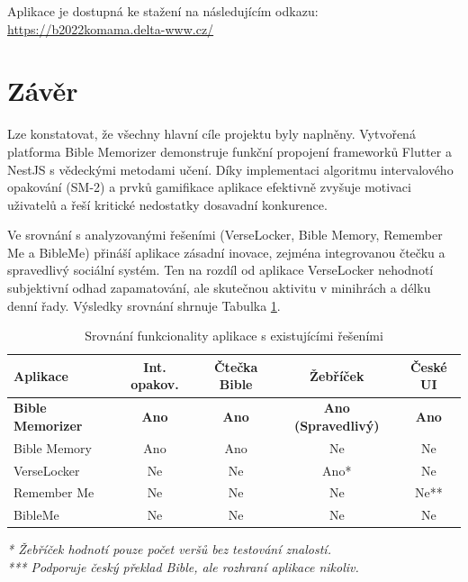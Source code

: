 \documentclass[12pt, a4paper, oneside]{article}
\begin{document}
	Aplikace je dostupná ke stažení na následujícím odkazu: \\
	\url{https://b2022komama.delta-www.cz/}
	
	\newpage
	\section*{Závěr}
	
	
	Lze konstatovat, že všechny hlavní cíle projektu byly naplněny. Vytvořená platforma Bible Memorizer demonstruje funkční propojení frameworků Flutter a NestJS s vědeckými metodami učení. Díky implementaci algoritmu intervalového opakování (SM-2) a prvků gamifikace aplikace efektivně zvyšuje motivaci uživatelů a řeší kritické nedostatky dosavadní konkurence.
	
	Ve srovnání s analyzovanými řešeními (VerseLocker, Bible Memory, Remember Me a BibleMe) přináší aplikace zásadní inovace, zejména integrovanou čtečku a spravedlivý sociální systém. Ten na rozdíl od aplikace VerseLocker nehodnotí subjektivní odhad zapamatování, ale skutečnou aktivitu v minihrách a délku denní řady. Výsledky srovnání shrnuje Tabulka \ref{tab:srovnani_aplikaci}.
	
	\begin{table}[H]
		\centering
		\renewcommand{\arraystretch}{1.2} %
		\small %
		\begin{tabular}{|l|c|c|c|c|}
			\hline
			\textbf{Aplikace} & \textbf{Int. opakov.} & \textbf{Čtečka Bible} & \textbf{Žebříček} & \textbf{České UI} \\
			\hline
			\hline
			\textbf{Bible Memorizer} & \textbf{Ano} & \textbf{Ano} & \textbf{Ano (Spravedlivý)} & \textbf{Ano} \\
			\hline
			Bible Memory & Ano & Ano & Ne & Ne \\
			\hline
			VerseLocker & Ne & Ne & Ano* & Ne \\
			\hline
			Remember Me & Ne & Ne & Ne & Ne** \\
			\hline
			BibleMe & Ne & Ne & Ne & Ne \\
			\hline
		\end{tabular}
		\caption{Srovnání funkcionality aplikace s existujícími řešeními}
		\label{tab:srovnani_aplikaci}
		\vspace{1mm}
		\scriptsize{ %
			\textit{* Žebříček hodnotí pouze počet veršů bez testování znalostí. \\
				*** Podporuje český překlad Bible, ale rozhraní aplikace nikoliv.}
		}
	\end{table}
	
\end{document}
